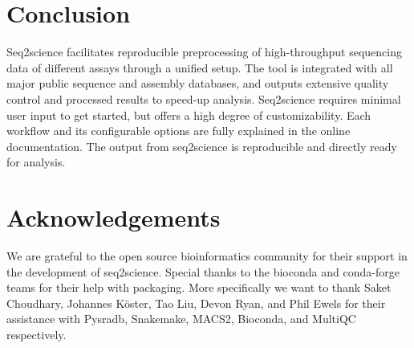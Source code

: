 \section{Conclusion}

Seq2science facilitates reproducible preprocessing of high-throughput sequencing data of different assays through a unified setup. The tool is integrated with all major public sequence and assembly databases, and outputs extensive quality control and processed results to speed-up analysis. Seq2science requires minimal user input to get started, but offers a high degree of customizability. Each workflow and its configurable options are fully explained in the online documentation. The output from seq2science is reproducible and directly ready for analysis.

\section{Acknowledgements}

We are grateful to the open source bioinformatics community for their support in the development of seq2science. Special thanks to the bioconda and conda-forge teams for their help with packaging. More specifically we want to thank Saket Choudhary, Johannes K{\"o}ster, Tao Liu, Devon Ryan, and Phil Ewels for their assistance with Pysradb, Snakemake, MACS2, Bioconda, and MultiQC respectively. 
